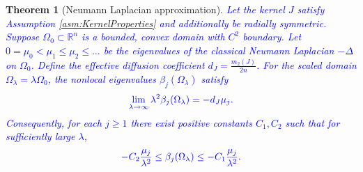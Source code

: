 \documentclass[12pt, a4paper]{article}
\newcommand{\revision}[1]{\textcolor{blue}{#1}}
\theoremstyle{break}
\newtheorem{thm}{Theorem}[section]
\theoremstyle{break}
\theoremstyle{break}
\theoremstyle{break}
\theoremstyle{break}
\theoremstyle{break}
\theoremstyle{break}
\theoremstyle{break}
\theoremstyle{break}
\begin{document}
\begin{thm}[Neumann Laplacian approximation]
    \label{thm:laplacian_approximation}
    \revision{Let the kernel $J$ satisfy Assumption \ref{asm:KernelProperties} and additionally be radially symmetric. Suppose $\Omega_0 \subset \mathbb{R}^n$ is a bounded, convex domain with $C^2$ boundary. Let $0 = \mu_0 < \mu_1 \leq \mu_2 \leq \ldots$ be the eigenvalues of the classical Neumann Laplacian $-\Delta$ on $\Omega_0$. Define the effective diffusion coefficient $d_J = \frac{m_2(J)}{2n}$. For the scaled domain $\Omega_\lambda = \lambda \Omega_0$, the nonlocal eigenvalues $\beta_j(\Omega_\lambda)$ satisfy}
    \begin{equation}
        \revision{\lim_{\lambda \to \infty} \lambda^2 \beta_j(\Omega_\lambda) = -d_J \mu_j.}
    \end{equation}
    \revision{Consequently, for each $j \geq 1$ there exist positive constants $C_1, C_2$ such that for sufficiently large $\lambda$,}
    \begin{equation}
        \revision{-C_2 \frac{\mu_j}{\lambda^2} \leq \beta_j(\Omega_\lambda) \leq -C_1 \frac{\mu_j}{\lambda^2}.}
    \end{equation}
\end{thm}
\end{document}

